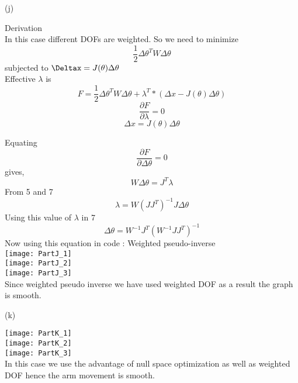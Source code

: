 \documentclass[12pt]{article}
\newenvironment{problem}[2][Problem]{\begin{trivlist}
\item[\hskip \labelsep {\bfseries #1}\hskip \labelsep {\bfseries #2.}]}{\end{trivlist}}
\begin{document}
\clearpage
\begin{problem} 1 (j)
\end{problem}
\begin{Answer}
Derivation \\
In this case different DOFs are weighted. So  we need to minimize
\begin{equation}
    \frac{1}{2} \Delta \theta^T W \Delta\theta
\end{equation}
subjected to $\Deltax = J(\theta) \Delta \theta$\\
Effective $\lambda$ is 
\begin{equation}
    F = \frac{1}{2} \Delta \theta^T W \Delta\theta + \lambda^T * (\Delta x - J(\theta)\Delta \theta)
\end{equation}
\begin{equation}
    \frac{\partial F}{\partial \lambda} = 0
\end{equation}
\begin{equation}
    \Delta x = J(\theta) \Delta \theta
\end{equation}

Equating
\begin{equation}
    \frac{\partial F}{\partial \Delta \theta} = 0
\end{equation}
gives,
\begin{equation}
    W \Delta \theta = J^T \lambda
\end{equation}
From 5 and 7
\begin{equation}
    \lambda = W (J J^T)^{-1} J \Delta\theta
\end{equation}
Using this value of $\lambda$ in 7
\begin{equation}
    \Delta\theta = W^{-1} J^{T} (W^{-1} J J^{T})^{-1}
\end{equation}
Now using this equation in code : Weighted pseudo-inverse\\
\texttt{[image: PartJ\_1]}\\
\vspace{2mm}
\texttt{[image: PartJ\_2]}\\
\vspace{2mm}
\texttt{[image: PartJ\_3]}\\
Since weighted pseudo inverse we have used weighted DOF as a result the graph is smooth. 
\end{Answer}

\clearpage
\begin{problem} 1 (k)
\end{problem}
\begin{Answer}
\texttt{[image: PartK\_1]}\\
\vspace{2mm}
\texttt{[image: PartK\_2]}\\
\vspace{2mm}
\texttt{[image: PartK\_3]}\\
In this case we use the advantage of null space optimization as well as weighted DOF hence the arm movement is smooth. 

\end{Answer}
\end{document}
